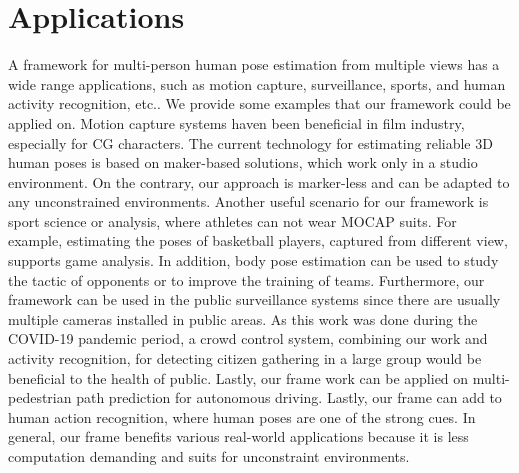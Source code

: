 \section{Applications}
A framework for multi-person human pose estimation from multiple views has a wide range applications, such as motion capture, surveillance, sports, and human activity recognition, etc.. We provide some examples that our framework could be applied on. Motion capture systems haven been beneficial in film industry, especially for CG characters. The current technology for estimating reliable 3D human poses is based on maker-based solutions, which work only in a studio environment. On the contrary, our approach is marker-less and can be adapted to any unconstrained environments. Another useful scenario for our framework is sport science or analysis, where athletes can not wear MOCAP suits. For example, estimating the poses of basketball players, captured from different view, supports game analysis. In addition, body pose estimation can be used to study the tactic of opponents or to improve the training of teams. Furthermore, our framework can be used in the public surveillance systems since there are usually multiple cameras installed in public areas. As this work was done during the COVID-19 pandemic period, a crowd control system, combining our work and activity recognition, for detecting citizen gathering in a large group would be beneficial to the health of public. Lastly, our frame work can be applied on multi-pedestrian path prediction for autonomous driving. Lastly, our frame can add to human action recognition, where human poses are one of the strong cues.
In general, our frame benefits various real-world applications because it is less computation demanding and suits for unconstraint environments. 

